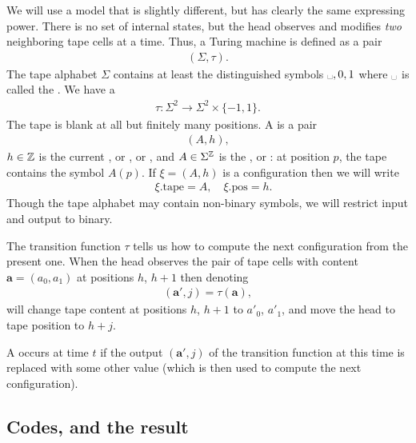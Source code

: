 \documentclass[11pt]{memoir}
\theoremstyle{definition} %
\renewcommand{\vek}[1]{\mathbf{#1}}
\newcommand{\va}{\vek{a}}
\newcommand{\blank}{\text{\textvisiblespace}}
\newcommand{\h}{h}
\newcommand{\pos}{\mathrm{pos}}
\newcommand{\tape}{\mathrm{tape}}
\begin{document}
We will use a model that is slightly different, but has clearly the same expressing power.
There is no set of internal states, but the head observes and modifies \emph{two}
neighboring tape cells at a time.
Thus, a Turing machine is defined as a pair
\begin{align*}
   (\Sigma,\tau).
 \end{align*}
The tape alphabet \( \Sigma \) contains at least the distinguished
symbols \( \blank,0,1 \) where \( \blank \) is called the .
We have a 
\begin{align*}
             \tau\colon\Sigma^{2}\to \Sigma^{2}\times\{-1,1\}.
\end{align*}
The tape is blank at all but finitely many positions.
A  is a pair 
        \begin{align*}
             (A,\h),
        \end{align*}
\( \h\in\bbZ \) is the current , or , or ,
and \( A\in\Sigma^{\mathbb{Z}} \) is the , or :
at position \( p \), the tape contains the symbol \( A(p) \).
If \( \xi=(A,\h) \) is a configuration then we will write
        \begin{align}\label{eq:config-1}
             \quad \xi.\tape=A,\quad \xi.\pos=\h.
        \end{align}
Though the tape alphabet may contain
non-binary symbols, we will restrict input and output to binary.

The transition function \( \tau \) tells us how to compute the next
configuration from the present one.
When the head observes the pair of tape cells
with content \( \va=(a_{0},a_{1}) \) at positions \( \h \), \( \h+1 \) then denoting
         \begin{align*}
           (\va',j)=\tau(\va),
         \end{align*}
will change tape content at positions \( \h \), \( \h+1 \) to \( a'_{0} \), \( a'_{1} \),
and move the head to tape position to \( \h+j \).

\begin{definition}[Fault]\label{def:fault}
A  occurs at time \( t \) if the output \( (\va',j) \)
of the    transition function at this time is replaced with some other value
(which is then used to compute the next configuration).
\end{definition}


\subsection{Codes, and the result}
\end{document}
